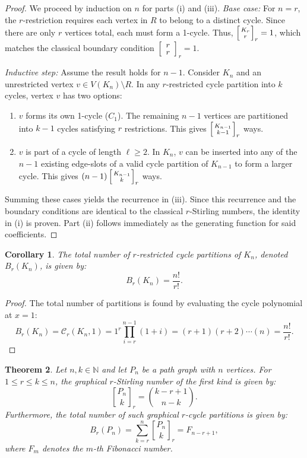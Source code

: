 \documentclass{amsart}
\newcounter{cases}
\newcommand{\str}[2]{\left[ \genfrac{}{}{0pt}{}{#1}{#2} \right]_r}
\newcommand{\cyc}{\mathcal{C}}
\newtheorem{theorem}{Theorem}[section]
\newtheorem{corollary}[theorem]{Corollary}
\theoremstyle{definition}
\def\st#1#2{\begin{bmatrix} #1 \\ #2 \end{bmatrix}}
\begin{document}
\begin{proof}
We proceed by induction on $n$ for parts (i) and (iii).
\textit{Base case:} For $n = r$, the $r$-restriction requires each vertex in $R$ to belong to a distinct cycle. Since there are only $r$ vertices total, each must form a 1-cycle. Thus, $\str{K_r}{r} = 1$, which matches the classical boundary condition $\st{r}{r}_r = 1$.

\textit{Inductive step:} Assume the result holds for $n-1$. Consider $K_n$ and an unrestricted vertex $v \in V(K_n) \setminus R$. In any $r$-restricted cycle partition into $k$ cycles, vertex $v$ has two options:
\begin{enumerate}
    \item $v$ forms its own 1-cycle ($C_1$). The remaining $n-1$ vertices are partitioned into $k-1$ cycles satisfying $r$ restrictions. This gives $\str{K_{n-1}}{k-1}$ ways.
    \item $v$ is part of a cycle of length $\ell \geq 2$. In $K_n$, $v$ can be inserted into any of the $n-1$ existing edge-slots of a valid cycle partition of $K_{n-1}$ to form a larger cycle. This gives $(n-1)\str{K_{n-1}}{k}$ ways.
\end{enumerate}
Summing these cases yields the recurrence in (iii). Since this recurrence and the boundary conditions are identical to the classical $r$-Stirling numbers, the identity in (i) is proven. Part (ii) follows immediately as the generating function for said coefficients.
\end{proof}



\begin{corollary}
The total number of $r$-restricted cycle partitions of $K_n$, denoted $B_r(K_n)$, is given by:
\begin{equation*}
    B_r(K_n) = \frac{n!}{r!}.
\end{equation*}
\end{corollary}

\begin{proof}
The total number of partitions is found by evaluating the cycle polynomial at $x=1$:
\begin{equation*}
    B_r(K_n) = \cyc_r(K_n, 1) = 1^r \prod_{i=r}^{n-1} (1 + i) = (r+1)(r+2)\cdots(n) = \frac{n!}{r!}.
\end{equation*}
\end{proof}


\begin{theorem}\label{thm:path_stirling}
Let $n, k \in \mathbb{N}$ and let $P_n$ be a path graph with $n$ vertices. For $1 \leq r \leq k \leq n$, the graphical $r$-Stirling number of the first kind is given by:
\begin{equation*}
    {P_n \brack k}_r = \binom{k-r+1}{n-k}.
\end{equation*}
Furthermore, the total number of such graphical $r$-cycle partitions is given by:
\begin{equation*}
      B_r(P_n)= \sum_{k=r}^{n} {P_n \brack k}_r = F_{n-r+1},
\end{equation*}
where $F_m$ denotes the $m$-th Fibonacci number.
\end{theorem}
\end{document}

